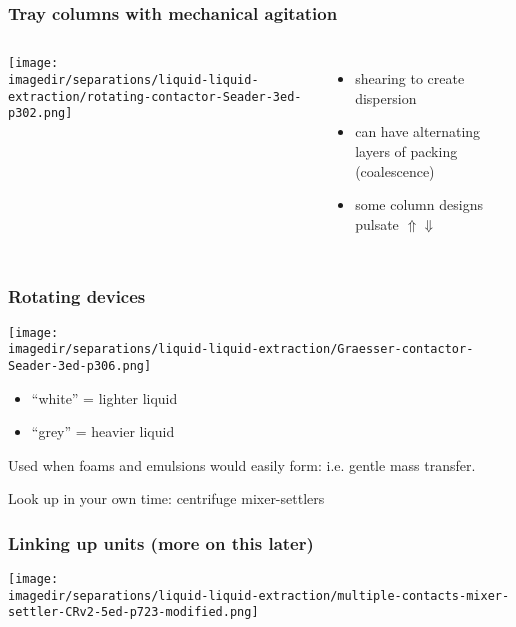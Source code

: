 \begin{frame}\frametitle{Tray columns with mechanical agitation}
	\begin{columns}[t]
			\begin{center}
				\texttt{[image: \\imagedir/separations/liquid-liquid-extraction/rotating-contactor-Seader-3ed-p302.png]}
			\end{center}

			\begin{itemize}
				\item	shearing to create dispersion
				\item	can have alternating layers of packing (coalescence)
				\item	some column designs pulsate $\Uparrow \Downarrow$
			\end{itemize}
	\end{columns}
\end{frame}



\begin{frame}\frametitle{Rotating devices}
	\begin{center}
		\texttt{[image: \\imagedir/separations/liquid-liquid-extraction/Graesser-contactor-Seader-3ed-p306.png]}
	\end{center}
	\vspace{-12pt}
	\begin{itemize}
		\item	``white'' = lighter liquid
		\item	``grey'' = heavier liquid
	\end{itemize}
	Used when foams and emulsions would easily form: i.e. gentle mass transfer.

	\vspace{12pt}
	{\color{myOrange}Look up in your own time: centrifuge mixer-settlers}
\end{frame}

\begin{frame}\frametitle{Linking up units (more on this later)}
	\begin{center}
		\texttt{[image: \\imagedir/separations/liquid-liquid-extraction/multiple-contacts-mixer-settler-CRv2-5ed-p723-modified.png]}
	\end{center}
\end{frame}


